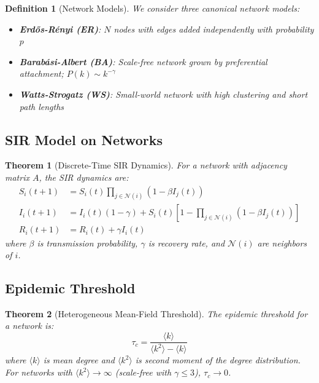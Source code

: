 \documentclass[a4paper, 11pt]{article}
\newtheorem{definition}{Definition}[section]
\newtheorem{theorem}{Theorem}[section]
\begin{document}
\begin{definition}[Network Models]
We consider three canonical network models:
\begin{itemize}
\item \textbf{Erdős-Rényi (ER)}: $N$ nodes with edges added independently with probability $p$
\item \textbf{Barabási-Albert (BA)}: Scale-free network grown by preferential attachment; $P(k) \sim k^{-\gamma}$
\item \textbf{Watts-Strogatz (WS)}: Small-world network with high clustering and short path lengths
\end{itemize}
\end{definition}

\subsection{SIR Model on Networks}

\begin{theorem}[Discrete-Time SIR Dynamics]
For a network with adjacency matrix $A$, the SIR dynamics are:
\begin{align}
S_i(t+1) &= S_i(t) \prod_{j \in \mathcal{N}(i)} (1 - \beta I_j(t)) \\
I_i(t+1) &= I_i(t)(1 - \gamma) + S_i(t)\left[1 - \prod_{j \in \mathcal{N}(i)} (1 - \beta I_j(t))\right] \\
R_i(t+1) &= R_i(t) + \gamma I_i(t)
\end{align}
where $\beta$ is transmission probability, $\gamma$ is recovery rate, and $\mathcal{N}(i)$ are neighbors of $i$.
\end{theorem}

\subsection{Epidemic Threshold}

\begin{theorem}[Heterogeneous Mean-Field Threshold]
The epidemic threshold for a network is:
\begin{equation}
\tau_c = \frac{\langle k \rangle}{\langle k^2 \rangle - \langle k \rangle}
\end{equation}
where $\langle k \rangle$ is mean degree and $\langle k^2 \rangle$ is second moment of the degree distribution.
For networks with $\langle k^2 \rangle \to \infty$ (scale-free with $\gamma \leq 3$), $\tau_c \to 0$.
\end{theorem}
\end{document}
